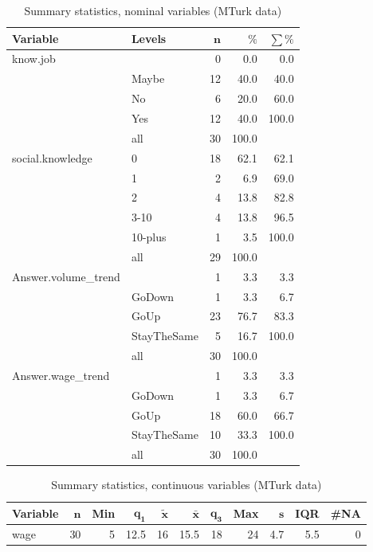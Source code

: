 \documentclass[a4paper,10pt]{article}\usepackage[]{graphicx}\usepackage[]{color}
\begin{document}
\begin{table}[ht]
\centering
{\footnotesize
\begin{tabular}{ll|rrr}
 \textbf{Variable} & \textbf{Levels} & $\mathbf{n}$ & $\mathbf{\%}$ & $\mathbf{\sum \%}$ \\ 
  \hline
know.job &  & 0 & 0.0 & 0.0 \\ 
   & Maybe & 12 & 40.0 & 40.0 \\ 
   & No & 6 & 20.0 & 60.0 \\ 
   & Yes & 12 & 40.0 & 100.0 \\ 
   \hline
 & all & 30 & 100.0 &  \\ 
   \hline
\hline
social.knowledge & 0 & 18 & 62.1 & 62.1 \\ 
   & 1 & 2 & 6.9 & 69.0 \\ 
   & 2 & 4 & 13.8 & 82.8 \\ 
   & 3-10 & 4 & 13.8 & 96.5 \\ 
   & 10-plus & 1 & 3.5 & 100.0 \\ 
   \hline
 & all & 29 & 100.0 &  \\ 
   \hline
\hline
Answer.volume\_trend &  & 1 & 3.3 & 3.3 \\ 
   & GoDown & 1 & 3.3 & 6.7 \\ 
   & GoUp & 23 & 76.7 & 83.3 \\ 
   & StayTheSame & 5 & 16.7 & 100.0 \\ 
   \hline
 & all & 30 & 100.0 &  \\ 
   \hline
\hline
Answer.wage\_trend &  & 1 & 3.3 & 3.3 \\ 
   & GoDown & 1 & 3.3 & 6.7 \\ 
   & GoUp & 18 & 60.0 & 66.7 \\ 
   & StayTheSame & 10 & 33.3 & 100.0 \\ 
   \hline
 & all & 30 & 100.0 &  \\ 
   \hline
\hline
\end{tabular}
}
\caption{Summary statistics, nominal variables (MTurk data)} 
\label{tab1:31-9090}
\end{table}
\begin{table}[ht]
\centering
{\footnotesize
\begin{tabular}{lrrrrrrrrrr}
 \textbf{Variable} & $\mathbf{n}$ & \textbf{Min} & $\mathbf{q_1}$ & $\mathbf{\widetilde{x}}$ & $\mathbf{\bar{x}}$ & $\mathbf{q_3}$ & \textbf{Max} & $\mathbf{s}$ & \textbf{IQR} & \textbf{\#NA} \\ 
  \hline
wage & 30 & 5 & 12.5 & 16 & 15.5 & 18 & 24 & 4.7 & 5.5 & 0 \\ 
  \end{tabular}
}
\caption{Summary statistics, continuous variables (MTurk data)} 
\label{tab2:31-9090}
\end{table}
\end{document}
